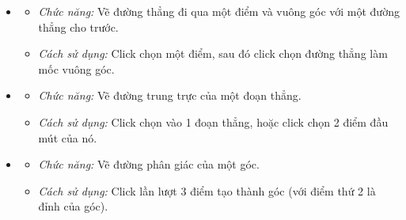 \documentclass[12pt,a4paper]{article}
\begin{document}
\begin{itemize}[label=\textcolor{primary}{\faGripLines}]
    \item {}
    \begin{itemize}
        \item \textit{Chức năng:} Vẽ đường thẳng đi qua một điểm và vuông góc với một đường thẳng cho trước.
        \item \textit{Cách sử dụng:} Click chọn một điểm, sau đó click chọn đường thẳng làm mốc vuông góc.
    \end{itemize}

    \item {}
    \begin{itemize}
        \item \textit{Chức năng:} Vẽ đường trung trực của một đoạn thẳng.
        \item \textit{Cách sử dụng:} Click chọn vào 1 đoạn thẳng, hoặc click chọn 2 điểm đầu mút của nó.
    \end{itemize}
    
    \item {}
    \begin{itemize}
        \item \textit{Chức năng:} Vẽ đường phân giác của một góc.
        \item \textit{Cách sử dụng:} Click lần lượt 3 điểm tạo thành góc (với điểm thứ 2 là đỉnh của góc).
    \end{itemize}
\end{itemize}
\end{document}
